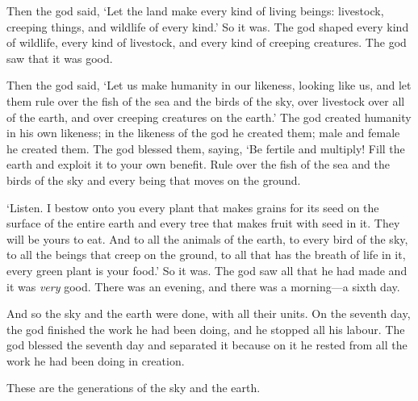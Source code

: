 Then the god said, 
`Let the land make every kind of living beings: 
livestock, creeping things, and wildlife of every kind.'
So it was. 
The god shaped every kind of wildlife, 
every kind of livestock, 
and every kind of creeping creatures. 
The god saw that it was good. 

Then the god said, 
`Let us make humanity in our likeness, looking like us, 
and let them rule over the fish of the sea and the birds of the sky, 
over livestock over all of the earth, 
and over creeping creatures on the earth.' 
The god created humanity in his own likeness; 
in the likeness of the god he created them;
male and female he created them. 
The god blessed them, saying, 
`Be fertile and multiply! 
Fill the earth and exploit it to your own benefit.
Rule over the fish of the sea and the birds of the sky 
and every being that moves on the ground.

`Listen. 
I bestow onto you every plant that makes grains for its seed 
on the surface of the entire earth 
and every tree that makes fruit with seed in it. 
They will be yours to eat. 
And to all the animals of the earth, 
to every bird of the sky, 
to all the beings that creep on the ground, 
to all that has the breath of life in it, 
every green plant is your food.'
So it was. 
The god saw all that he had made and it was \textit{very} good. 
There was an evening, and there was a morning---a sixth day.

And so the sky and the earth were done, with all their units. 
On the seventh day, the god finished the work he had been doing, 
and he stopped all his labour. 
The god blessed the seventh day and separated it 
because on it he rested from all the work he had been doing in creation.

These are the generations of the sky and the earth. 
